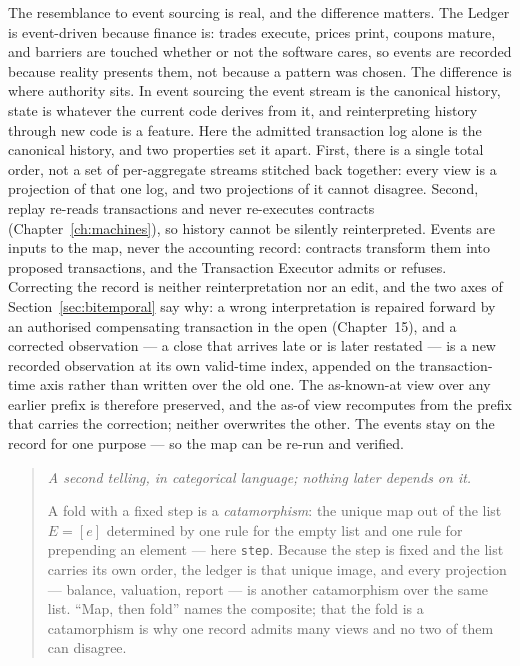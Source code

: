 \documentclass[11pt,a4paper]{article}
\newenvironment{secondtelling}%
  {\par\medskip\noindent\begin{quote}\small\emph{A second telling, in categorical language; nothing later depends on it.}\par\smallskip}%
  {\end{quote}\medskip}
\begin{document}
The resemblance to event sourcing is real, and the difference matters. The Ledger is
event-driven because finance is: trades execute, prices print, coupons mature, and
barriers are touched whether or not the software cares, so events are recorded because
reality presents them, not because a pattern was chosen. The difference is where authority
sits. In event sourcing the event stream is the canonical history, state is whatever the
current code derives from it, and reinterpreting history through new code is a feature.
Here the admitted transaction log alone is the canonical history, and two properties set it
apart. First, there is a single total order, not a set of per-aggregate streams stitched
back together: every view is a projection of that one log, and two projections of it cannot
disagree. Second, replay re-reads transactions and never re-executes contracts
(Chapter~\ref{ch:machines}), so history cannot be silently reinterpreted. Events are inputs
to the map, never the accounting record: contracts transform them into proposed
transactions, and the Transaction Executor admits or refuses. Correcting the record is
neither reinterpretation nor an edit, and the two axes of Section~\ref{sec:bitemporal} say
why: a wrong interpretation is repaired forward by an authorised compensating transaction in the open
(Chapter~15), and a corrected observation --- a close that arrives late or is later restated
--- is a new recorded observation at its own valid-time index, appended on the
transaction-time axis rather than written over the old one. The as-known-at view over any
earlier prefix is therefore preserved, and the as-of view recomputes from the prefix that
carries the correction; neither overwrites the other. The events stay on the record for one
purpose --- so the map can be re-run and verified.

\begin{secondtelling}
A fold with a fixed step is a \emph{catamorphism}: the unique map out of the list $E=[e]$
determined by one rule for the empty list and one rule for prepending an element --- here
\texttt{step}. Because the step is fixed and the list carries its own order, the ledger is
that unique image, and every projection --- balance, valuation, report --- is another
catamorphism over the same list. ``Map, then fold'' names the composite; that the fold is
a catamorphism is why one record admits many views and no two of them can disagree.
\end{secondtelling}

\end{document}
